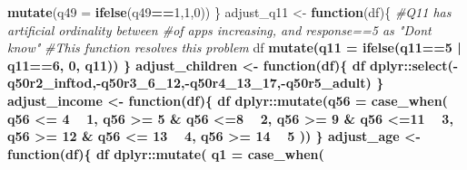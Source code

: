 \documentclass[]{article}
\newenvironment{Shaded}{\begin{snugshade}}{\end{snugshade}}
\newcommand{\KeywordTok}[1]{\textcolor[rgb]{0.13,0.29,0.53}{\textbf{#1}}}
\newcommand{\DataTypeTok}[1]{\textcolor[rgb]{0.13,0.29,0.53}{#1}}
\newcommand{\DecValTok}[1]{\textcolor[rgb]{0.00,0.00,0.81}{#1}}
\newcommand{\StringTok}[1]{\textcolor[rgb]{0.31,0.60,0.02}{#1}}
\newcommand{\CommentTok}[1]{\textcolor[rgb]{0.56,0.35,0.01}{\textit{#1}}}
\newcommand{\ControlFlowTok}[1]{\textcolor[rgb]{0.13,0.29,0.53}{\textbf{#1}}}
\newcommand{\OperatorTok}[1]{\textcolor[rgb]{0.81,0.36,0.00}{\textbf{#1}}}
\newcommand{\NormalTok}[1]{#1}
\begin{document}
\begin{Shaded}
\begin{Highlighting}[]
{{{{{{{{{{{\StringTok{    }\KeywordTok{mutate}\NormalTok{(}\DataTypeTok{q49 =} \KeywordTok{ifelse}\NormalTok{(q49}\OperatorTok{==}\DecValTok{1}\NormalTok{,}\DecValTok{1}\NormalTok{,}\DecValTok{0}\NormalTok{))}
\NormalTok{\}}
\NormalTok{adjust_q11 <-}\StringTok{ }\ControlFlowTok{function}\NormalTok{(df)\{}
  \CommentTok{#Q11 has artificial ordinality between #of apps increasing, and response==5 as "Dont know"}
  \CommentTok{#This function resolves this problem}
\NormalTok{  df }\OperatorTok{%>%}\StringTok{ }
\StringTok{    }\KeywordTok{mutate}\NormalTok{(}\DataTypeTok{q11 =} \KeywordTok{ifelse}\NormalTok{(q11}\OperatorTok{==}\DecValTok{5} \OperatorTok{|}\StringTok{ }\NormalTok{q11}\OperatorTok{==}\DecValTok{6}\NormalTok{, }\DecValTok{0}\NormalTok{, q11))}
\NormalTok{\}}
\NormalTok{adjust_children <-}\StringTok{ }\ControlFlowTok{function}\NormalTok{(df)\{}
\NormalTok{  df }\OperatorTok{%>%}\StringTok{ }
\StringTok{    }\NormalTok{dplyr}\OperatorTok{::}\KeywordTok{select}\NormalTok{(}\OperatorTok{-}\NormalTok{q50r2_inftod,}\OperatorTok{-}\NormalTok{q50r3_6_}\DecValTok{12}\NormalTok{,}\OperatorTok{-}\NormalTok{q50r4_13_}\DecValTok{17}\NormalTok{,}\OperatorTok{-}\NormalTok{q50r5_adult)}
\NormalTok{\}}
\NormalTok{adjust_income <-}\StringTok{ }\ControlFlowTok{function}\NormalTok{(df)\{}
\NormalTok{  df }\OperatorTok{%>%}\StringTok{ }
\StringTok{    }\NormalTok{dplyr}\OperatorTok{::}\KeywordTok{mutate}\NormalTok{(}\DataTypeTok{q56 =} \KeywordTok{case_when}\NormalTok{(}
\NormalTok{      q56 }\OperatorTok{<=}\StringTok{ }\DecValTok{4} \OperatorTok{~}\StringTok{ }\DecValTok{1}\NormalTok{,}
\NormalTok{      q56 }\OperatorTok{>=}\StringTok{ }\DecValTok{5} \OperatorTok{&}\StringTok{ }\NormalTok{q56 }\OperatorTok{<=}\DecValTok{8} \OperatorTok{~}\StringTok{ }\DecValTok{2}\NormalTok{,}
\NormalTok{      q56 }\OperatorTok{>=}\StringTok{ }\DecValTok{9} \OperatorTok{&}\StringTok{ }\NormalTok{q56 }\OperatorTok{<=}\DecValTok{11} \OperatorTok{~}\StringTok{ }\DecValTok{3}\NormalTok{,}
\NormalTok{      q56 }\OperatorTok{>=}\StringTok{ }\DecValTok{12} \OperatorTok{&}\StringTok{ }\NormalTok{q56 }\OperatorTok{<=}\StringTok{ }\DecValTok{13} \OperatorTok{~}\StringTok{ }\DecValTok{4}\NormalTok{,}
\NormalTok{      q56 }\OperatorTok{>=}\StringTok{ }\DecValTok{14} \OperatorTok{~}\StringTok{ }\DecValTok{5}
\NormalTok{    ))}
\NormalTok{\}}
\NormalTok{adjust_age <-}\StringTok{ }\ControlFlowTok{function}\NormalTok{(df)\{}
\NormalTok{  df }\OperatorTok{%>%}\StringTok{ }
\StringTok{    }\NormalTok{dplyr}\OperatorTok{::}\KeywordTok{mutate}\NormalTok{(}
      \DataTypeTok{q1 =} \KeywordTok{case_when}\NormalTok{(}
}}}}}}}}}}}}}}}
\end{Highlighting}
\end{Shaded}
\end{document}
